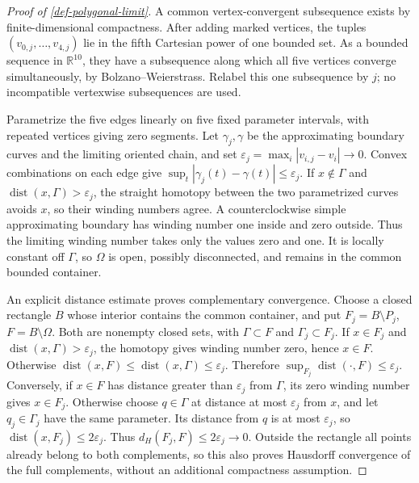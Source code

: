 \documentclass[11pt,a4paper]{article}
\theoremstyle{proofmanuscript}
\begin{document}
\begin{proof}[Proof of \ref{def-polygonal-limit}]

A common vertex-convergent subsequence exists by finite-dimensional compactness. After adding marked vertices, the tuples \((v_{0,j},\ldots,v_{4,j})\) lie in the fifth Cartesian power of one bounded set. As a bounded sequence in \(\mathbb R^{10}\), they have a subsequence along which all five vertices converge simultaneously, by Bolzano--Weierstrass. Relabel this one subsequence by \(j\); no incompatible vertexwise subsequences are used.

Parametrize the five edges linearly on five fixed parameter intervals, with repeated vertices giving zero segments. Let \(\gamma_j,\gamma\) be the approximating boundary curves and the limiting oriented chain, and set \(\varepsilon_j=\max_i|v_{i,j}-v_i|\to0\). Convex combinations on each edge give \(\sup_t|\gamma_j(t)-\gamma(t)|\le\varepsilon_j\). If \(x\notin\Gamma\) and \(\operatorname{dist}(x,\Gamma)>\varepsilon_j\), the straight homotopy between the two parametrized curves avoids \(x\), so their winding numbers agree. A counterclockwise simple approximating boundary has winding number one inside and zero outside. Thus the limiting winding number takes only the values zero and one. It is locally constant off \(\Gamma\), so \(\Omega\) is open, possibly disconnected, and remains in the common bounded container.

An explicit distance estimate proves complementary convergence. Choose a closed rectangle \(B\) whose interior contains the common container, and put \(F_j=B\setminus P_j\), \(F=B\setminus\Omega\). Both are nonempty closed sets, with \(\Gamma\subset F\) and \(\Gamma_j\subset F_j\). If \(x\in F_j\) and \(\operatorname{dist}(x,\Gamma)>\varepsilon_j\), the homotopy gives winding number zero, hence \(x\in F\). Otherwise \(\operatorname{dist}(x,F)\le\operatorname{dist}(x,\Gamma)\le\varepsilon_j\). Therefore \(\sup_{F_j}\operatorname{dist}(\cdot,F)\le\varepsilon_j\). Conversely, if \(x\in F\) has distance greater than \(\varepsilon_j\) from \(\Gamma\), its zero winding number gives \(x\in F_j\). Otherwise choose \(q\in\Gamma\) at distance at most \(\varepsilon_j\) from \(x\), and let \(q_j\in\Gamma_j\) have the same parameter. Its distance from \(q\) is at most \(\varepsilon_j\), so \(\operatorname{dist}(x,F_j)\le2\varepsilon_j\). Thus \(d_H(F_j,F)\le2\varepsilon_j\to0\). Outside the rectangle all points already belong to both complements, so this also proves Hausdorff convergence of the full complements, without an additional compactness assumption.


\end{proof}
\end{document}
